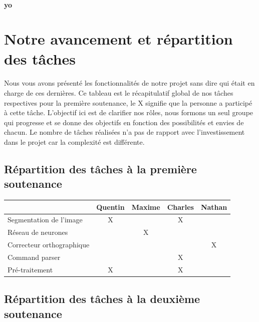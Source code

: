 \documentclass{article}
\begin{document}
\paragraph{yo}

\newpage
{}
\section{Notre avancement et répartition des tâches}


\paragraph{} Nous vous avons présenté les fonctionnalités de notre projet sans dire qui était en charge de ces dernières. Ce tableau est le récapitulatif global de nos tâches respectives pour la première soutenance, le X signifie que la personne a participé à cette tâche. L'objectif ici est de clarifier nos rôles, nous formons un seul groupe qui progresse et se donne des objectifs en fonction des possibilités et envies de chacun. Le nombre de tâches réalisées n'a pas de rapport avec l'investissement dans le projet car la complexité est différente.

\subsection{Répartition des tâches à la première soutenance}


\begin{center}
\vspace*{0.2cm}
\begin{tabular}{|l|c|c|c|c|}
  \hline
  & Quentin & Maxime & Charles & Nathan \\
  \hline
  Segmentation de l'image & X &  & X &  \\
  \hline
  Réseau de neurones &  & X &  &  \\
  \hline
  Correcteur orthographique &  &  &  & X \\
  \hline
  Command parser &  & & X &  \\
  \hline
  Pré-traitement & X &  & X & \\
  \hline
\end{tabular}
\end{center}

\vspace*{1cm}

\subsection{Répartition des tâches à la deuxième soutenance}
\end{document}
